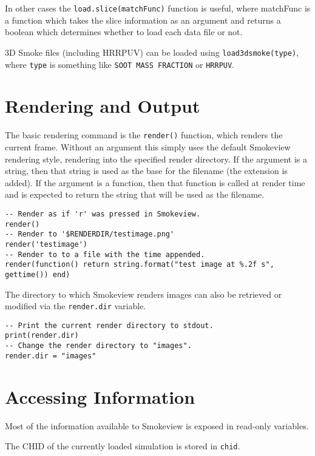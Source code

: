 \documentclass[11pt,twoside]{book}
\begin{document}
In other cases the \lstinline{load.slice(matchFunc)} function is useful, where
matchFunc is a function which takes the slice information as an argument and
returns a boolean which determines whether to load each data file or not.

3D Smoke files (including HRRPUV) can be loaded using
\lstinline{load3dsmoke(type)}, where \lstinline{type} is something like
\lstinline{SOOT MASS FRACTION} or \lstinline{HRRPUV}.

\section{Rendering and Output}

The basic rendering command is the \lstinline[style=lua]{render()} function,
which renders the current frame. Without an argument this simply uses the
default Smokeview rendering style, rendering into the specified render
directory. If the argument is a string, then that string is used as the base for
the filename (the extension is added). If the argument is a function, then that
function is called at render time and is expected to return the string that will
be used as the filename.

\begin{lstlisting}[style=lua]
-- Render as if 'r' was pressed in Smokeview.
render()
-- Render to '$RENDERDIR/testimage.png'
render('testimage')
-- Render to to a file with the time appended.
render(function() return string.format("test image at %.2f s", gettime()) end)
\end{lstlisting}

The directory to which Smokeview renders images can also be retrieved or
modified via the \lstinline{render.dir} variable.

\begin{lstlisting}[style=lua]
-- Print the current render directory to stdout.
print(render.dir)
-- Change the render directory to "images".
render.dir = "images"
\end{lstlisting}

\section{Accessing Information}

Most of the information available to Smokeview is exposed in read-only
variables.

The CHID of the currently loaded simulation is stored in \lstinline{chid}.
\end{document}
